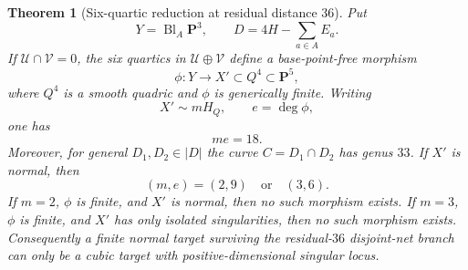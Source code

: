 \documentclass[11pt,reqno]{amsart}
\newtheorem{theorem}{Theorem}[section]
\theoremstyle{remark}
\newcommand{\PP}{\mathbf P}
\begin{document}
\begin{theorem}[Six-quartic reduction at residual distance $36$]\label{thm:r36global}
Put
\[
Y=\operatorname{Bl}_A\PP^3,
\qquad
D=4H-\sum_{a\in A}E_a.
\]
If $\mathcal U\cap\mathcal V=0$, the six quartics in $\mathcal U\oplus\mathcal V$ define a base-point-free morphism
\[
\phi:Y\longrightarrow X'\subset Q^4\subset\PP^5,
\]
where $Q^4$ is a smooth quadric and $\phi$ is generically finite.  Writing
\[
X'\sim mH_Q,
\qquad e=\deg\phi,
\]
one has
\[
me=18.
\]
Moreover, for general $D_1,D_2\in|D|$ the curve $C=D_1\cap D_2$ has genus $33$.  If $X'$ is normal, then
\[
\boxed{(m,e)=(2,9)\quad\text{or}\quad(3,6).}
\]
If $m=2$, $\phi$ is finite, and $X'$ is normal, then no such morphism exists.  If $m=3$, $\phi$ is finite, and $X'$ has only isolated singularities, then no such morphism exists.  Consequently a finite normal target surviving the residual-$36$ disjoint-net branch can only be a cubic target with positive-dimensional singular locus.
\end{theorem}
\end{document}
